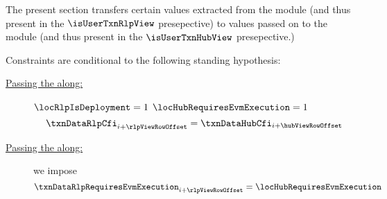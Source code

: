 \begin{center}
\end{center}
The present section transfers certain values
extracted from the \rlpTxnMod{} module (and thus present in the $\isUserTxnRlpView$ presepective) to
values passed on to the \hubMod{} module (and thus present in the $\isUserTxnHubView$ presepective.)

Constraints are conditional to the following standing hypothesis:
\begin{description}
	\item[\underline{Passing the \cfi{} along:}]
		\If $\locRlpIsDeployment = 1$ \et $\locHubRequiresEvmExecution = 1$ \Then
		\[
			\txnDataRlpCfi  _{i + \rlpViewRowOffset} = \txnDataHubCfi _{i + \hubViewRowOffset}
		\]
	\item[\underline{Passing the \requiresEvmExecutionName{} along:}]
		we impose
		\[
			\txnDataRlpRequiresEvmExecution _{i + \rlpViewRowOffset}
			=
			\locHubRequiresEvmExecution
		\]
\end{description}
